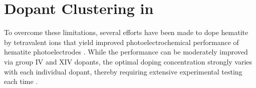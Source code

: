\def\be{\Delta_{quad}}

\section{Dopant Clustering in }
To overcome these limitations, several efforts have been made to dope hematite by tetravalent ions that yield improved photoelectrochemical performance of hematite photoelectrodes
\cite{lohaus2018limitation,biswas2020tuning,ling2011sn,li2017morphology,kumar2011electrodeposited,fu2014highly,malviya2017influence,yang2013new,tian2020electronic,liu2013ge}.
While the performance can be moderately improved via group IV and XIV dopants, the optimal doping concentration strongly varies with each individual dopant,\cite{kumar2011electrodeposited,fu2014highly,malviya2017influence,yang2013new,tian2020electronic,liu2013ge} thereby requiring extensive experimental testing each time \cite{walsh2017instilling}.


